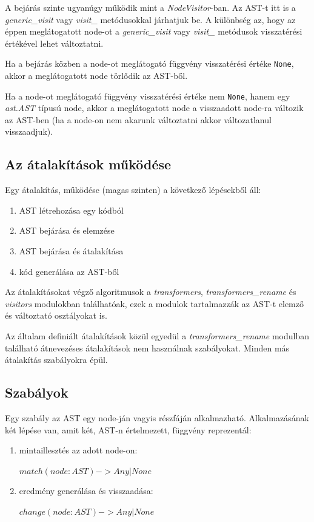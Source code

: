 A bejárás szinte ugyanúgy működik mint a \emph{NodeVisitor}-ban.
Az AST-t itt is a \emph{generic\_visit} vagy \emph{visit\_<node-class>} metódusokkal
járhatjuk be.
A különbség az, hogy az éppen meglátogatott node-ot a
\emph{generic\_visit} vagy \emph{visit\_<node-class>}
metódusok visszatérési értékével lehet változtatni. 

Ha a bejárás közben a node-ot meglátogató függvény visszatérési értéke \texttt{None},
akkor a meglátogatott node törlődik az AST-ből.

Ha a node-ot meglátogató függvény visszatérési értéke nem \texttt{None},
hanem egy \emph{ast.AST} típusú node,
akkor a meglátogatott node a visszaadott node-ra változik az AST-ben
(ha a node-on nem akarunk változtatni akkor változatlanul visszaadjuk).

\subsection{Az átalakítások működése}

Egy átalakítás, működése (magas szinten) a következő lépésekből áll:

\begin{enumerate}
	\item AST létrehozása egy kódból
	\item AST bejárása és elemzése
	\item AST bejárása és átalakítása
	\item kód generálása az AST-ből
\end{enumerate}

Az átalakításokat végző algoritmusok a \emph{transformers}, \emph{transformers\_rename}
és \emph{visitors} modulokban találhatóak, ezek a modulok tartalmazzák az AST-t
elemző és változtató osztályokat is.

Az általam definiált átalakítások közül egyedül
a \emph{transformers\_rename} modulban található átnevezéses
átalakítások nem használnak szabályokat.
Minden más átalakítás szabályokra épül.

\subsection{Szabályok}

Egy szabály az AST egy node-ján vagyis részfáján alkalmazható.
Alkalmazásának két lépése van, amit két, AST-n értelmezett, függvény reprezentál:

\begin{enumerate}
	\item mintaillesztés az adott node-on:
	
	\(match(node: AST) -> Any | None \)
	
	\item eredmény generálása és visszaadása:
	
	\(change(node: AST) -> Any | None \)
\end{enumerate}

